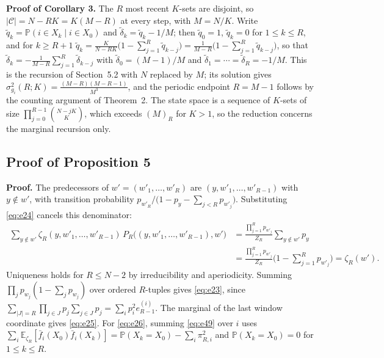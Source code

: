 \documentclass[twoside,11pt]{article}
\begin{document}
\textbf{Proof of Corollary 3.} The $R$ most recent $K$-sets are disjoint, so $|\mathcal{C}|=N-RK=K(M-R)$ at every step, with $M=N/K$. Write $\tilde q_k=\mathbb{P}(i\in X_k\mid i\in X_0)$ and $\tilde\delta_k=\tilde q_k-1/M$; then $\tilde q_0=1$, $\tilde q_k=0$ for $1\leq k\leq R$, and for $k\geq R+1$
$\tilde q_k=\frac{K}{N-RK}\Big(1-\sum_{j=1}^{R}\tilde q_{k-j}\Big)=\frac{1}{M-R}\Big(1-\sum_{j=1}^{R}\tilde q_{k-j}\Big)$,
so that $\tilde\delta_k=-\frac{1}{M-R}\sum_{j=1}^{R}\tilde\delta_{k-j}$ with $\tilde\delta_0=(M-1)/M$ and $\tilde\delta_1=\cdots=\tilde\delta_R=-1/M$. This is the recursion of Section~5.2 with $N$ replaced by $M$; its solution gives $\sigma_{g_i}^2(R;K)=\frac{(M-R)(M-R-1)}{M^{3}}$, and the periodic endpoint $R=M-1$ follows by the counting argument of Theorem~2. The state space is a sequence of $K$-sets of size $\prod_{j=0}^{R-1}\binom{N-jK}{K}$, which exceeds $(M)_R$ for $K>1$, so the reduction concerns the marginal recursion only.

\subsection{Proof of Proposition 5}
\textbf{Proof.} The predecessors of $w'=(w'_1,\dots,w'_R)$ are
$(y,w'_1,\dots,w'_{R-1})$ with $y\notin w'$, with transition probability
$p_{w'_R}/\big(1-p_y-\sum_{j<R}p_{w'_j}\big)$. Substituting
\eqref{eq:e24} cancels this denominator:
\begin{equation}\label{eq:e43}
\begin{aligned}
\sum_{y\notin w'}\zeta_R(y,w'_1,\dots,w'_{R-1})\,P_R\big((y,w'_1,\dots,w'_{R-1}),w'\big)
&=\frac{\prod_{j=1}^{R}p_{w'_j}}{Z_R}\sum_{y\notin w'}p_y\\
&=\frac{\prod_{j=1}^{R}p_{w'_j}}{Z_R}\Big(1-\sum_{j=1}^{R}p_{w'_j}\Big)=\zeta_R(w').
\end{aligned}
\end{equation}
Uniqueness holds for $R\leq N-2$ by irreducibility and aperiodicity.
Summing $\prod_jp_{w_j}(1-\sum_jp_{w_j})$ over ordered $R$-tuples gives
\eqref{eq:e23}, since
$\sum_{|J|=R}\prod_{j\in J}p_j\sum_{j\in J}p_j
=\sum_i p_i^{2}e_{R-1}^{(i)}$. The marginal of the last window coordinate
gives \eqref{eq:e25}. For \eqref{eq:e26}, summing
\eqref{eq:e49} over $i$ uses
$\sum_i\mathbb{E}_{\zeta_R}[\bar f_i(X_0)\bar f_i(X_k)]
=\mathbb{P}(X_k=X_0)-\sum_i\pi_{R,i}^{2}$ and
$\mathbb{P}(X_k=X_0)=0$ for $1\leq k\leq R$.
\end{document}
